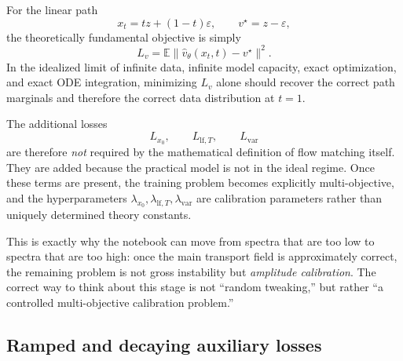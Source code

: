 \documentclass[11pt]{article}
\newcommand{\EE}{\mathbb{E}}
\newcommand{\e}{\varepsilon}
\begin{document}
For the linear path
\begin{equation}
  x_t = t z + (1-t)\e,
  \qquad
  v^\star = z-\e,
\end{equation}
the theoretically fundamental objective is simply
\begin{equation}
  L_v = \EE\|\hat v_\theta(x_t,t)-v^\star\|^2.
\end{equation}
In the idealized limit of infinite data, infinite model capacity, exact optimization, and exact ODE integration, minimizing \(L_v\) alone should recover the correct path marginals and therefore the correct data distribution at \(t=1\).

The additional losses
\begin{equation}
  L_{x_0},\qquad L_{\mathrm{lf},T},\qquad L_{\mathrm{var}}
\end{equation}
are therefore \emph{not} required by the mathematical definition of flow matching itself. They are added because the practical model is not in the ideal regime. Once these terms are present, the training problem becomes explicitly multi-objective, and the hyperparameters \(\lambda_{x_0},\lambda_{\mathrm{lf},T},\lambda_{\mathrm{var}}\) are calibration parameters rather than uniquely determined theory constants.

This is exactly why the notebook can move from spectra that are too low to spectra that are too high: once the main transport field is approximately correct, the remaining problem is not gross instability but \emph{amplitude calibration}. The correct way to think about this stage is not ``random tweaking,'' but rather ``a controlled multi-objective calibration problem.''

\subsection{Ramped and decaying auxiliary losses}
\end{document}
